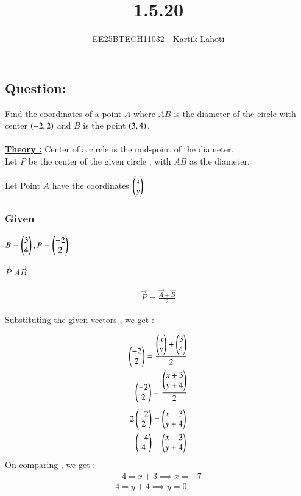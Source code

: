 \documentclass[journal]{IEEEtran}
\numberwithin{equation}{enumi}
\numberwithin{figure}{enumi}
\begin{document}

\vspace{3cm}

\title{1.5.20}
\author{EE25BTECH11032 - Kartik Lahoti}
\maketitle

\subsection*{\textbf{Question:} } 
Find the coordinates of a point $A$ where $AB$ is the diameter of the circle with center $\left(-2,2 \right)$ and $B$ is the point $\left(3,4\right).$\\
\solution \\ 

\underline{\textbf{Theory :}} Center of a circle is the mid-point of the diameter. \\

Let $P$ be the center of the given circle , with $AB$ as the diameter.

Let Point $A$ have the coordinates $\begin{pmatrix}x\\y\end{pmatrix}$
\subsubsection*{Given }
 $B \equiv \begin{pmatrix}3 \\ 4\end{pmatrix} , P \equiv \begin{pmatrix}-2\\2\end{pmatrix}$ 
 
 $\vec{P}$  $\vec{AB}$ 

\begin{align}    
    \vec{P} = \frac{\vec{A} + \vec{B}}{2}  
\end{align}

Substituting the given vectors , we get : 

\begin{align}
    \begin{pmatrix}-2\\2\end{pmatrix} = \frac{\begin{pmatrix}x\\y\end{pmatrix} + \begin{pmatrix}3 \\ 4\end{pmatrix}}{2} \\ 
    \begin{pmatrix}-2\\2\end{pmatrix} = \frac{\begin{pmatrix}x+3 \\ y +4 \end{pmatrix}}{2}     
\end{align}
\begin{align}
    2\begin{pmatrix}-2\\2\end{pmatrix} = \begin{pmatrix}x+3 \\ y +4 \end{pmatrix} \\ 
    \begin{pmatrix}-4\\4\end{pmatrix} = \begin{pmatrix}x+3 \\ y +4 \end{pmatrix}
\end{align}
On comparing , we get : 
\begin{align}
    -4 = x +3 \implies x = -7\\
    4 = y + 4 \implies y = 0 
\end{align} 
\end{document}
